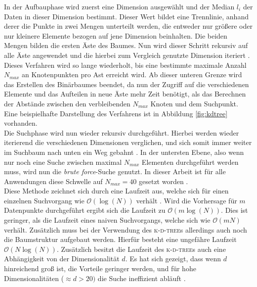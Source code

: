 In der Aufbauphase wird zuerst eine Dimension ausgewählt und der Median $l_i$ der Daten in dieser Dimension bestimmt. Dieser Wert bildet eine Trennlinie, anhand derer die Punkte in zwei Mengen unterteilt werden, die entweder nur größere oder nur kleinere Elemente bezogen auf jene Dimension beinhalten. Die beiden Mengen bilden die ersten Äste des Baumes. Nun wird dieser Schritt rekursiv auf alle Äste angewendet und die hierbei zum Vergleich genutzte Dimension iteriert \cite{de2000computational}. Dieses Verfahren wird so lange wiederholt, bis eine bestimmte maximale Anzahl $N_{max}$ an Knotenpunkten pro Ast erreicht wird. Ab dieser unteren Grenze wird das Erstellen des Binärbaumes beendet, da nun der Zugriff auf die verschiedenen Elemente und das Aufteilen in neue Äste mehr Zeit benötigt, als das Berechnen der Abstände zwischen den verbleibenden $N_{max}$ Knoten und dem Suchpunkt. Eine beispielhafte Darstellung des Verfahrens ist in Abbildung \ref{fig:kdtree} vorhanden.\\

Die Suchphase wird nun wieder rekursiv durchgeführt. Hierbei werden wieder iterierend die verschiedenen Dimensionen verglichen, und sich somit immer weiter im Suchbaum nach unten ein Weg gebahnt \cite{de2000computational}. In der untersten Ebene, also wenn nur noch eine Suche zwischen maximal $N_{max}$ Elementen durchgeführt werden muss, wird nun die \textit{brute force}-Suche genutzt. In dieser Arbeit ist für alle Anwendungen diese Schwelle auf $N_{max} = 40$ gesetzt worden \citep{scikitlearnneighbours}.\\

Diese Methode zeichnet sich durch eine Laufzeit aus, welche sich für einen einzelnen Suchvorgang wie $\mathcal{O}(\log(N))$ verhält \cite{bentley1975multidimensional}. Wird die Vorhersage für $m$ Datenpunkte durchgeführt ergibt sich die Laufzeit zu $\mathcal{O}(m\log(N))$. Dies ist geringer, als die Laufzeit eines naiven Suchvorgangs, welche sich wie $\mathcal{O}(mN)$ verhält. Zusätzlich muss bei der Verwendung des \textsc{k-d-tree}s allerdings auch noch die Baumstruktur aufgebaut werden. Hierfür besteht eine ungefähre Laufzeit $\mathcal{O}(N \log(N))$. Zusätzlich besitzt die Laufzeit des \textsc{k-d-tree}s auch eine Abhängigkeit von der Dimensionalität $d$. Es hat sich gezeigt, dass wenn $d$ hinreichend groß ist, die Vorteile geringer werden, und für hohe Dimensionalitäten ($\approx d > 20)$ die Suche ineffizient abläuft \citep{scikitlearnneighbours}.\\

